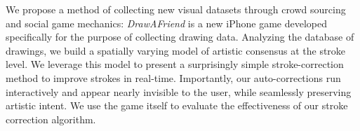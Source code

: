 
We propose a method of collecting new visual datasets through crowd
sourcing and social game mechanics: {\em DrawAFriend} is a new
iPhone game developed specifically for the purpose of collecting
drawing data. Analyzing the database of drawings, we build a
spatially varying model of artistic consensus at the stroke level.
We leverage this model to present a surprisingly simple
stroke-correction method to improve strokes in real-time. Importantly,
our auto-corrections run interactively and appear nearly invisible
to the user, while seamlessly preserving artistic intent. We use the
game itself to evaluate the effectiveness of our stroke correction
algorithm.
